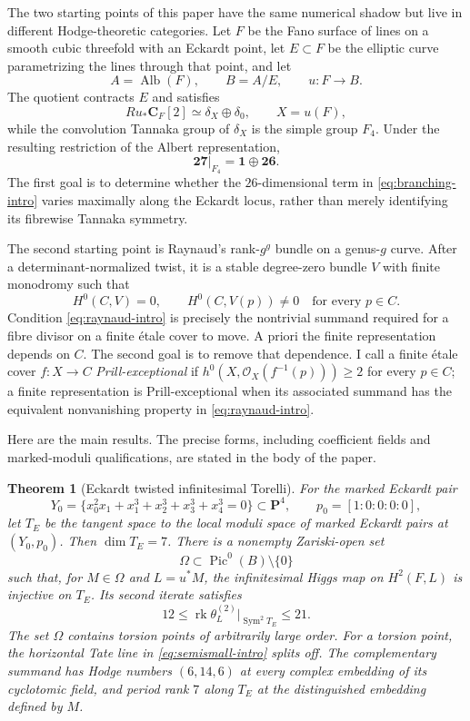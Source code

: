 \documentclass[11pt,reqno]{amsart}
\numberwithin{equation}{section}
\newtheorem{theorem}{Theorem}[section]
\theoremstyle{definition}
\theoremstyle{remark}
\newcommand{\C}{\mathbf C}
\newcommand{\OO}{\mathcal O}
\newcommand{\PP}{\mathbf P}
\newcommand{\rk}{\operatorname{rk}}
\newcommand{\Alb}{\operatorname{Alb}}
\newcommand{\Pic}{\operatorname{Pic}}
\newcommand{\Sym}{\operatorname{Sym}}
\begin{document}
The two starting points of this paper have the same numerical shadow but live in different Hodge-theoretic categories.  Let $F$ be the Fano surface of lines on a smooth cubic threefold with an Eckardt point, let $E\subset F$ be the elliptic curve parametrizing the lines through that point, and let
\[
A=\Alb(F),\qquad B=A/E,\qquad u:F\longrightarrow B.
\]
The quotient contracts $E$ and satisfies
\begin{equation}\label{eq:semismall-intro}
Ru_*\C_F[2]\simeq \delta_X\oplus\delta_0,
\qquad X=u(F),
\end{equation}
while the convolution Tannaka group of $\delta_X$ is the simple group $F_4$.  Under the resulting restriction of the Albert representation,
\begin{equation}\label{eq:branching-intro}
\mathbf{27}|_{F_4}=\mathbf 1\oplus\mathbf{26}.
\end{equation}
The first goal is to determine whether the $26$-dimensional term in \eqref{eq:branching-intro} varies maximally along the Eckardt locus, rather than merely identifying its fibrewise Tannaka symmetry.

The second starting point is Raynaud's rank-$g^g$ bundle on a genus-$g$ curve.  After a determinant-normalized twist, it is a stable degree-zero bundle $V$ with finite monodromy such that
\begin{equation}\label{eq:raynaud-intro}
H^0(C,V)=0,
\qquad H^0(C,V(p))\ne0\quad\text{for every }p\in C.
\end{equation}
Condition \eqref{eq:raynaud-intro} is precisely the nontrivial summand required for a fibre divisor on a finite \'etale cover to move.  A priori the finite representation depends on $C$.  The second goal is to remove that dependence.
I call a finite \'etale cover $f:X\to C$ \emph{Prill-exceptional} if
$h^0(X,\OO_X(f^{-1}(p)))\ge2$ for every $p\in C$; a finite representation is Prill-exceptional when its associated summand has the equivalent nonvanishing property in \eqref{eq:raynaud-intro}.

Here are the main results.  The precise forms, including coefficient fields and marked-moduli qualifications, are stated in the body of the paper.

\begin{theorem}[Eckardt twisted infinitesimal Torelli]\label{thm:intro-eckardt}
For the marked Eckardt pair
\[
Y_0=\{x_0^2x_1+x_1^3+x_2^3+x_3^3+x_4^3=0\}\subset\PP^4,
\qquad p_0=[1:0:0:0:0],
\]
let $T_E$ be the tangent space to the local moduli space of marked Eckardt pairs at $(Y_0,p_0)$.  Then $\dim T_E=7$.  There is a nonempty Zariski-open set
\[
\Omega\subset\Pic^0(B)\setminus\{0\}
\]
such that, for $M\in\Omega$ and $L=u^*M$, the infinitesimal Higgs map on $H^2(F,L)$ is injective on $T_E$.  Its second iterate satisfies
\[
12\le\rk\theta_L^{(2)}|_{\Sym^2T_E}\le21.
\]
The set $\Omega$ contains torsion points of arbitrarily large order.  For a torsion point, the horizontal Tate line in \eqref{eq:semismall-intro} splits off.  The complementary summand has Hodge numbers $(6,14,6)$ at every complex embedding of its cyclotomic field, and period rank $7$ along $T_E$ at the distinguished embedding defined by $M$.
\end{theorem}
\end{document}
